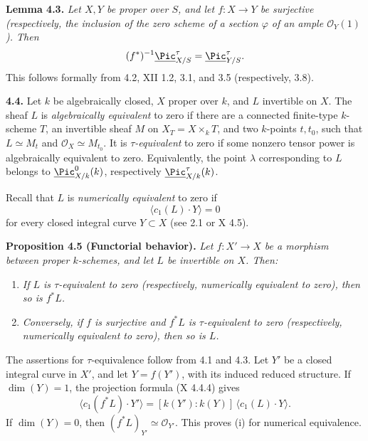 \textbf{Lemma 4.3.} \emph{Let \(X,Y\) be proper over \(S\), and let
\(f:X\to Y\) be surjective (respectively, the inclusion of the zero
scheme of a section \(\varphi\) of an ample \(\mathcal O_Y(1)\)). Then}
\[
(f^*)^{-1}\underline{\Pic}^\tau_{X/S}
=\underline{\Pic}^\tau_{Y/S}.
\]
This follows formally from 4.2, XII 1.2, 3.1, and 3.5 (respectively,
3.8).

\textbf{4.4.} Let \(k\) be algebraically closed, \(X\) proper over \(k\),
and \(L\) invertible on \(X\). The sheaf \(L\) is \emph{algebraically
equivalent} to zero if there are a connected finite-type \(k\)-scheme
\(T\), an invertible sheaf \(M\) on \(X_T=X\times_kT\), and two
\(k\)-points \(t,t_0\), such that \(L\simeq M_t\) and
\(\mathcal O_X\simeq M_{t_0}\). It is \emph{\(\tau\)-equivalent} to zero
if some nonzero tensor power is algebraically equivalent to zero.
Equivalently, the point \(\lambda\) corresponding to \(L\) belongs to
\(\underline{\Pic}^0_{X/k}(k)\), respectively
\(\underline{\Pic}^\tau_{X/k}(k)\).

Recall that \(L\) is \emph{numerically equivalent} to zero if
\[
\langle c_1(L)\cdot Y\rangle=0
\]
for every closed integral curve \(Y\subset X\) (see 2.1 or X 4.5).

\textbf{Proposition 4.5 (Functorial behavior).} \emph{Let
\(f:X'\to X\) be a morphism between proper \(k\)-schemes, and let \(L\)
be invertible on \(X\). Then:}
\begin{enumerate}[label=(\roman*)]
\item \emph{If \(L\) is \(\tau\)-equivalent to zero (respectively,
numerically equivalent to zero), then so is \(f^*L\).}
\item \emph{Conversely, if \(f\) is surjective and \(f^*L\) is
\(\tau\)-equivalent to zero (respectively, numerically equivalent to
zero), then so is \(L\).}
\end{enumerate}

The assertions for \(\tau\)-equivalence follow from 4.1 and 4.3. Let
\(Y'\) be a closed integral curve in \(X'\), and let \(Y=f(Y')\), with
its induced reduced structure. If \(\dim(Y)=1\), the projection formula
(X 4.4.4) gives
\begin{equation}
\langle c_1(f^*L)\cdot Y'\rangle
=[k(Y'):k(Y)]\,\langle c_1(L)\cdot Y\rangle.
\tag{4.5.1}
\end{equation}
If \(\dim(Y)=0\), then \((f^*L)_{Y'}\simeq\mathcal O_{Y'}\). This proves
(i) for numerical equivalence.


